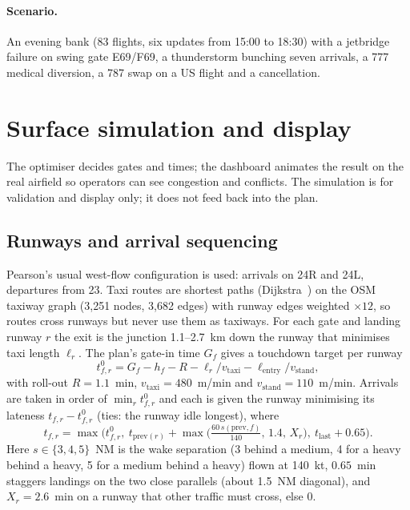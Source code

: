 \documentclass[11pt]{article}
\theoremstyle{remark}
\begin{document}
\paragraph{Scenario.} An evening bank (83 flights, six updates from 15:00 to 18:30) with a jetbridge
failure on swing gate E69/F69, a thunderstorm bunching seven arrivals, a 777 medical diversion, a
787 swap on a US flight and a cancellation.

\section{Surface simulation and display}\label{sec:sim}
The optimiser decides gates and times; the dashboard animates the result on the real airfield so
operators can see congestion and conflicts. The simulation is for validation and display only; it
does not feed back into the plan.

\subsection{Runways and arrival sequencing}
Pearson's usual west-flow configuration is used: arrivals on 24R and 24L, departures from 23. Taxi
routes are shortest paths (Dijkstra~\cite{dijkstra1959}) on the OSM taxiway graph (3{,}251 nodes,
3{,}682 edges) with runway edges weighted $\times12$, so routes cross runways but never use them as
taxiways. For each gate and landing runway $r$ the exit is the junction 1.1--2.7~km down the runway
that minimises taxi length $\ell_r$. The plan's gate-in time $G_f$ gives a touchdown target per runway
\begin{equation}
t^0_{f,r} = G_f - h_f - R - \ell_r/v_{\text{taxi}} - \ell_{\text{entry}}/v_{\text{stand}},
\end{equation}
with roll-out $R=1.1$~min, $v_{\text{taxi}}=480$~m/min and $v_{\text{stand}}=110$~m/min. Arrivals are
taken in order of $\min_r t^0_{f,r}$ and each is given the runway minimising its lateness
$t_{f,r}-t^0_{f,r}$ (ties: the runway idle longest), where
\begin{equation}
t_{f,r} = \max\Big(t^0_{f,r},\ t_{\text{prev}(r)} + \max\big(\tfrac{60\,s(\text{prev},f)}{140},\,1.4,\,X_r\big),\ t_{\text{last}}+0.65\Big).
\end{equation}
Here $s\in\{3,4,5\}$~NM is the wake separation (3 behind a medium, 4 for a heavy behind a heavy, 5
for a medium behind a heavy) flown at 140~kt, $0.65$~min staggers landings on the two close parallels (about
1.5~NM diagonal), and $X_r=2.6$~min on a runway that other traffic must cross, else 0.
\end{document}
